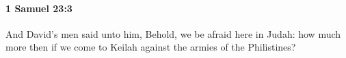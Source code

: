 
		\paragraph{1 Samuel 23:3} %
			\label{1SAMUEL-23-3}

			And David’s men said unto him, Behold, we be afraid here in Judah: how much more then if we come to Keilah against the armies of the Philistines?


